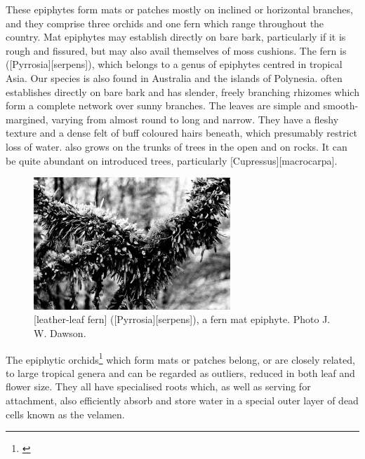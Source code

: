 These epiphytes form mats or patches mostly on inclined or horizontal branches, and they comprise three orchids and one fern which range throughout the country.
Mat epiphytes may establish directly on bare bark, particularly if it is rough and fissured, but may also avail themselves of moss cushions.
The fern is  ([Pyrrosia][serpens]), which belongs to a genus of epiphytes centred in tropical Asia.
Our species is also found in Australia and the islands of Polynesia.  often establishes directly on bare bark and has slender, freely branching rhizomes which form a complete network over sunny branches.
The leaves are simple and smooth-margined, varying from almost round to long and narrow.
They have a fleshy texture and a dense felt of buff coloured hairs beneath, which presumably restrict loss of water.  also grows on the trunks of trees in the open and on rocks.
It can be quite abundant on introduced trees, particularly  [Cupressus][macrocarpa].

\begin{figure}
	\includegraphics[width=0.66\textwidth]{graphics/figure38pyrrosia.jpg}
	\centering
	\caption[Leather-leaf fern, \emph{Pyrrosia serpens}, a fern mat epiphyte]{[leather-leaf fern] ([Pyrrosia][serpens]), a fern mat epiphyte.
	Photo  J. W. Dawson.}%
	\label{fig:38pyrrosia}
\end{figure}

The epiphytic orchids\footnote{\cite{hatch1948epiphytic}} which form mats or patches belong, or are closely related, to large tropical genera and can be regarded as outliers, reduced in both leaf and flower size.
They all have specialised roots which, as well as serving for attachment, also efficiently absorb and store water in a special outer layer of dead cells known as the velamen.

